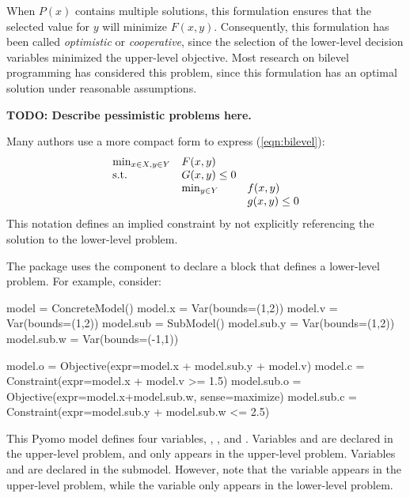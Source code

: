 When $P(x)$ contains multiple solutions, this formulation ensures
that the selected value for $y$ will minimize $F(x,y)$.  Consequently,
this formulation has been called \textit{optimistic} or
\textit{cooperative}, since the selection of the lower-level decision
variables minimized the upper-level objective.  Most research on
bilevel programming has considered this problem, since this formulation
has an optimal solution under reasonable assumptions.

\textbf{TODO: Describe pessimistic problems here.}

Many authors use a more compact form to express (\ref{eqn:bilevel}):
\begin{equation}
\label{eqn:bilevel-compact}
\begin{array}{lll}
\min_{x \in X, y \in Y}   & F(x,y) & \\
\textrm{s.t.}                       & G(x,y) \leq 0 & \\
                          & \min_{y \in Y}    & f(x,y)\\
                          &                   & g(x,y) \leq 0
\end{array}
\end{equation}
This notation defines an implied constraint by not explicitly referencing the solution to the lower-level problem.

The  package uses the  component to declare a block that defines a lower-level problem. 
For example, consider:
\begin{qlisting}
model = ConcreteModel()
model.x = Var(bounds=(1,2))
model.v = Var(bounds=(1,2))
model.sub = SubModel()
model.sub.y = Var(bounds=(1,2))
model.sub.w = Var(bounds=(-1,1))

model.o = Objective(expr=model.x + model.sub.y + model.v)
model.c = Constraint(expr=model.x + model.v >= 1.5)
model.sub.o = Objective(expr=model.x+model.sub.w, sense=maximize)
model.sub.c = Constraint(expr=model.sub.y + model.sub.w <= 2.5)
\end{qlisting}
This Pyomo model defines four variables, , ,  and .
Variables  and  are declared in the upper-level
problem, and  only appears in the upper-level problem.
Variables  and  are declared in the submodel.
However, note that the  variable appears in the upper-level
problem, while the  variable only appears in the
lower-level problem.

